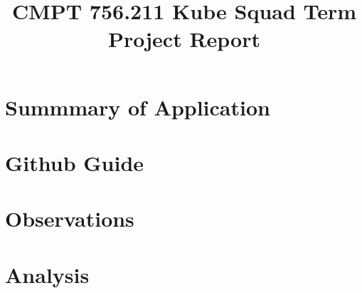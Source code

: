 \documentclass{article}
\title{CMPT 756.211 Kube Squad Term Project Report}
\begin{document}
\maketitle

\section{Summmary of Application}

\section{Github Guide}

\section{Observations}

\section{Analysis}





\end{document}
